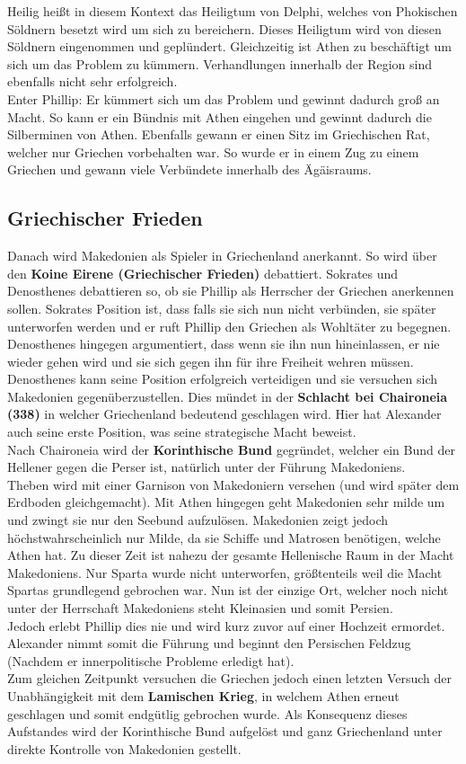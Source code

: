 \documentclass{article}
\begin{document}
	Heilig heißt in diesem Kontext das Heiligtum von Delphi, welches von Phokischen Söldnern besetzt wird um sich zu bereichern. Dieses Heiligtum wird von diesen Söldnern eingenommen und geplündert. Gleichzeitig ist Athen zu beschäftigt um sich um das Problem zu kümmern. Verhandlungen innerhalb der Region sind ebenfalls nicht sehr erfolgreich. \\
	Enter Phillip: Er kümmert sich um das Problem und gewinnt dadurch groß an Macht. So kann er ein Bündnis mit Athen eingehen und gewinnt dadurch die Silberminen von Athen. Ebenfalls gewann er einen Sitz im Griechischen Rat, welcher nur Griechen vorbehalten war. So wurde er in einem Zug zu einem Griechen und gewann viele Verbündete innerhalb des Ägäisraums. \\
	\subsection{Griechischer Frieden}
	Danach wird Makedonien als Spieler in Griechenland anerkannt. So wird über den \textbf{Koine Eirene (Griechischer Frieden)} debattiert. Sokrates und Denosthenes debattieren so, ob sie Phillip als Herrscher der Griechen anerkennen sollen. Sokrates Position ist, dass falls sie sich nun nicht verbünden, sie später unterworfen werden und er ruft Phillip den Griechen als Wohltäter zu begegnen. Denosthenes hingegen argumentiert, dass wenn sie ihn nun hineinlassen, er nie wieder gehen wird und sie sich gegen ihn für ihre Freiheit wehren müssen. \\
	Denosthenes kann seine Position erfolgreich verteidigen und sie versuchen sich Makedonien gegenüberzustellen. Dies mündet in der \textbf{Schlacht bei Chaironeia (338)} in welcher Griechenland bedeutend geschlagen wird. Hier hat Alexander auch seine erste Position, was seine strategische Macht beweist. \\
	Nach Chaironeia wird der \textbf{Korinthische Bund} gegründet, welcher ein Bund der Hellener gegen die Perser ist, natürlich unter der Führung Makedoniens. \\
	Theben wird mit einer Garnison von Makedoniern versehen (und wird später dem Erdboden gleichgemacht). Mit Athen hingegen geht Makedonien sehr milde um und zwingt sie nur den Seebund aufzulösen. Makedonien zeigt jedoch höchstwahrscheinlich nur Milde, da sie Schiffe und Matrosen benötigen, welche Athen hat. Zu dieser Zeit ist nahezu der gesamte Hellenische Raum in der Macht Makedoniens. Nur Sparta wurde nicht unterworfen, größtenteils weil die Macht Spartas grundlegend gebrochen war. Nun ist der einzige Ort, welcher noch nicht unter der Herrschaft Makedoniens steht Kleinasien und somit Persien. \\
	Jedoch erlebt Phillip dies nie und wird kurz zuvor auf einer Hochzeit ermordet. Alexander nimmt somit die Führung und beginnt den Persischen Feldzug (Nachdem er innerpolitische Probleme erledigt hat). \\
	Zum gleichen Zeitpunkt versuchen die Griechen jedoch einen letzten Versuch der Unabhängigkeit mit dem \textbf{Lamischen Krieg}, in welchem Athen erneut geschlagen und somit endgütlig gebrochen wurde. Als Konsequenz dieses Aufstandes wird der Korinthische Bund aufgelöst und ganz Griechenland unter direkte Kontrolle von Makedonien gestellt. \\
\end{document}
